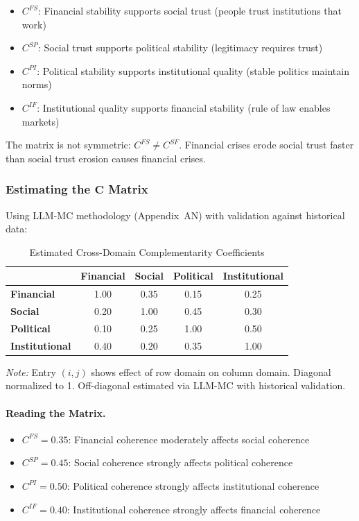 \begin{itemize}
    \item $C^{FS}$: Financial stability supports social trust (people trust institutions that work)
    \item $C^{SP}$: Social trust supports political stability (legitimacy requires trust)
    \item $C^{PI}$: Political stability supports institutional quality (stable politics maintain norms)
    \item $C^{IF}$: Institutional quality supports financial stability (rule of law enables markets)
\end{itemize}

The matrix is not symmetric: $C^{FS} \neq C^{SF}$. Financial crises erode social 
trust faster than social trust erosion causes financial crises.

\subsubsection{Estimating the $\mathbf{C}$ Matrix}

Using LLM-MC methodology (Appendix~AN) with validation against historical data:

\begin{table}[htbp]
\centering
\caption{Estimated Cross-Domain Complementarity Coefficients}
\label{tab:C-estimates}
\small
\begin{tabular}{@{}lcccc@{}}
\toprule
& \textbf{Financial} & \textbf{Social} & \textbf{Political} & \textbf{Institutional} \\
\midrule
\textbf{Financial} & 1.00 & 0.35 & 0.15 & 0.25 \\
\textbf{Social} & 0.20 & 1.00 & 0.45 & 0.30 \\
\textbf{Political} & 0.10 & 0.25 & 1.00 & 0.50 \\
\textbf{Institutional} & 0.40 & 0.20 & 0.35 & 1.00 \\
\bottomrule
\end{tabular}
\begin{flushleft}
\small\textit{Note:} Entry $(i,j)$ shows effect of row domain on column domain. 
Diagonal normalized to 1. Off-diagonal estimated via LLM-MC with historical validation.
\end{flushleft}
\end{table}

\paragraph{Reading the Matrix.}
\begin{itemize}
    \item $C^{FS} = 0.35$: Financial coherence moderately affects social coherence
    \item $C^{SP} = 0.45$: Social coherence strongly affects political coherence
    \item $C^{PI} = 0.50$: Political coherence strongly affects institutional coherence
    \item $C^{IF} = 0.40$: Institutional coherence strongly affects financial coherence
\end{itemize}

